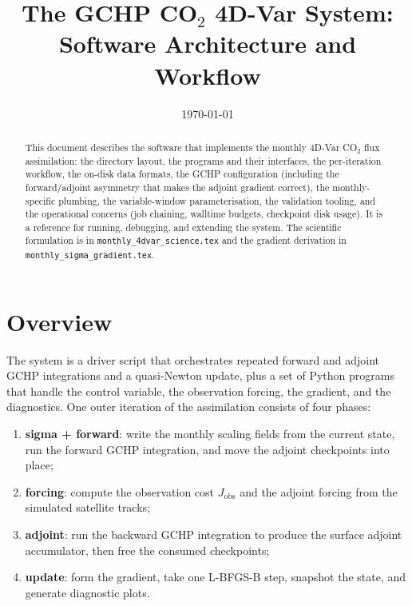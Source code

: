 \documentclass[11pt]{article}
\title{\textbf{The GCHP CO$_2$ 4D-Var System:\\
Software Architecture and Workflow}}
\author{}
\date{\today}
\newcommand{\code}[1]{\texttt{#1}}
\begin{document}
\maketitle

\begin{abstract}
This document describes the software that implements the monthly 4D-Var CO$_2$
flux assimilation: the directory layout, the programs and their interfaces, the
per-iteration workflow, the on-disk data formats, the GCHP configuration
(including the forward/adjoint asymmetry that makes the adjoint gradient correct),
the monthly-specific plumbing, the variable-window parameterisation, the
validation tooling, and the operational concerns (job chaining, walltime budgets,
checkpoint disk usage). It is a reference for running, debugging, and extending
the system. The scientific formulation is in \code{monthly\_4dvar\_science.tex}
and the gradient derivation in \code{monthly\_sigma\_gradient.tex}.
\end{abstract}

\tableofcontents

\section{Overview}

The system is a driver script that orchestrates repeated forward and adjoint
GCHP integrations and a quasi-Newton update, plus a set of Python programs that
handle the control variable, the observation forcing, the gradient, and the
diagnostics. One outer iteration of the assimilation consists of four phases:

\begin{enumerate}[nosep]
  \item \textbf{sigma + forward}: write the monthly scaling fields from the
        current state, run the forward GCHP integration, and move the adjoint
        checkpoints into place;
  \item \textbf{forcing}: compute the observation cost $J_{\mathrm{obs}}$ and the
        adjoint forcing from the simulated satellite tracks;
  \item \textbf{adjoint}: run the backward GCHP integration to produce the surface
        adjoint accumulator, then free the consumed checkpoints;
  \item \textbf{update}: form the gradient, take one L-BFGS-B step, snapshot the
        state, and generate diagnostic plots.
\end{enumerate}
\end{document}
